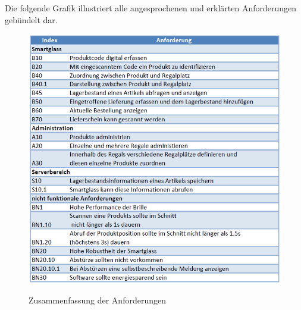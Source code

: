 Die folgende Grafik illustriert alle angesprochenen und erklärten Anforderungen gebündelt dar. 
\begin{figure}[H]
	\centering
	{\includegraphics[scale=0.9]{Bilder/Abbildungen/anforderungen_zusammenfassung.png}}
	\caption{Zusammenfassung der Anforderungen}
	\label{fig:jwt_encode}
\end{figure}